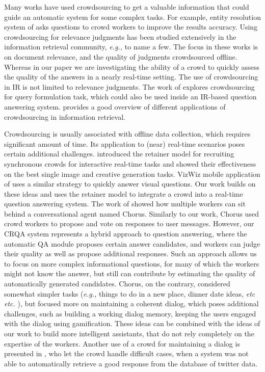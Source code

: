 \documentclass[letterpaper]{article}
\makeatletter
\newcommand{\eg}{\textit{e.g.,}\@\xspace}
\newcommand{\etc}{%
    \@ifnextchar{.}%
        {\textit{etc}}%
        {\textit{etc.}\@\xspace}%
}
\makeatother
\begin{document}
Many works have used crowdsourcing to get a valuable information that could guide an automatic system for some complex tasks.
For example, entity resolution system of \cite{Whang:2013:QSC:2536336.2536337} asks questions to crowd workers to improve the results accuracy.
Using crowdsourcing for relevance judgments has been studied extensively in the information retrieval community, \eg \cite{Alonso:2008:CRE:1480506.1480508,alonso2011design,grady2010crowdsourcing} to name a few.
The focus in these works is on document relevance, and the quality of judgments crowdsourced offline.
Whereas in our paper we are investigating the ability of a crowd to quickly assess the quality of the answers in a nearly real-time setting.
The use of crowdsourcing in IR is not limited to relevance judgments.
The work of \cite{harris2013comparing} explores crowdsourcing for query formulation task, which could also be used inside an IR-based question answering system.
\cite{lease2013crowdsourcing} provides a good overview of different applications of crowdsourcing in information retrieval.

Crowdsourcing is usually associated with offline data collection, which requires significant amount of time.
Its application to (near) real-time scenarios poses certain additional challenges.
\cite{bernstein2011crowds} introduced the retainer model for recruiting synchronous crowds for interactive real-time tasks and showed their effectiveness on the best single image and creative generation tasks.
VizWiz mobile application of \cite{bigham2010vizwiz} uses a similar strategy to quickly answer visual questions.
Our work builds on these ideas and uses the retainer model to integrate a crowd into a real-time question answering system.
The work of \cite{Lasecki:2013:CCC:2501988.2502057} showed how multiple workers can sit behind a conversational agent named Chorus.
Similarly to our work, Chorus used crowd workers to propose and vote on responses to user messages.
However, our CRQA system represents a hybrid approach to question answering, where the automatic QA module proposes certain answer candidates, and workers can judge their quality as well as propose additional responses.
Such an approach allows us to focus on more complex informational questions, for many of which the workers might not know the answer, but still can contribute by estimating the quality of automatically generated candidates.
Chorus, on the contrary, considered somewhat simpler tasks (\eg things to do in a new place, dinner date ideas, \etc), but focused more on maintaining a coherent dialog, which poses additional challenges, such as building a working dialog memory, keeping the users engaged with the dialog using gamification.
These ideas can be combined with the ideas of our work to build more intelligent assistants, that do not rely completely on the expertise of the workers.
Another use of a crowd for maintaining a dialog is presented in \cite{Bessho:2012:DSU:2392800.2392841}, who let the crowd handle difficult cases, when a system was not able to automatically retrieve a good response from the database of twitter data.
\end{document}
